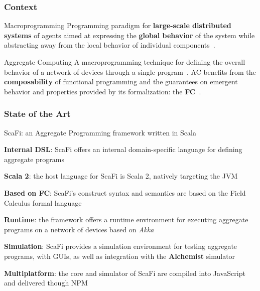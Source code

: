 \begin{frame}
    \titlepage
\end{frame}


\begin{frame}
    \frametitle{Context}
    \begin{block}{Macroprogramming}
        Programming paradigm for \textbf{large-scale distributed systems} of agents aimed at expressing the \textbf{global behavior} of the system while abstracting away from the local behavior of individual components~\cite{macroprogramming-state-of-the-art}.
    \end{block}
    \begin{block}{Aggregate Computing}
        A macroprogramming technique for defining the overall behavior of a network of devices through a single program~\cite{aggregate-programming}.
        \ac{AC} benefits from the \textbf{composability} of functional programming and the guarantees on emergent behavior and properties provided by its formalization: the \textbf{\ac{FC}}~\cite{fc}.
    \end{block}
\end{frame}

\begin{frame}
    \frametitle{State of the Art}
    \begin{blockitems}{ScaFi: an Aggregate Programming framework written in Scala}
        \item \textbf{Internal \ac{DSL}}: ScaFi offers an internal domain-specific language for defining aggregate programs~\cite{scafi}
        \item \textbf{Scala 2}: the host language for ScaFi is Scala 2, natively targeting the \ac{JVM}~\cite{scafi-thesis}
        \item \textbf{Based on \ac{FC}}: ScaFi's construct syntax and semantics are based on the Field Calculus formal language
        \item \textbf{Runtime}: the framework offers a runtime environment for executing aggregate programs on a network of devices based on \textit{Akka}
        \item \textbf{Simulation}: ScaFi provides a simulation environment for testing aggregate programs, with \acp{GUI}, as well as integration with the \textbf{Alchemist} simulator~\cite{alchemist,scafi-with-alchemist}
        \item \textbf{Multiplatform}: the core and simulator of ScaFi are compiled into JavaScript and delivered though \ac{NPM}
    \end{blockitems}
\end{frame}

